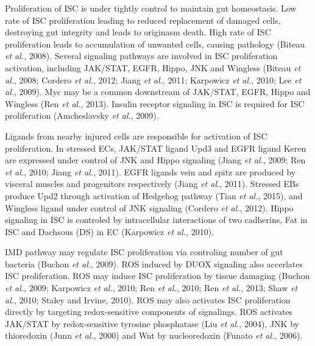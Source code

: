 \documentclass[11pt]{article}
\begin{document}
\newline

Proliferation of ISC is under tightly control to maintain gut homeostasis. 
Low rate of ISC proliferation leading to reduced replacement of damaged cells, destroying gut integrity and leads to originasm death. 
High rate of ISC proliferation leads to accumulation of unwanted cells, causing pathology (Biteau \textit{et al.}, 2008). 
Several signaling pathways are involved in ISC proliferation activation, including JAK/STAT, EGFR, Hippo, JNK and Wingless (Biteau \textit{et al.}, 2008; Cordero \textit{et al.}, 2012; Jiang \textit{et al.}, 2011; Karpowicz \textit{et al.}, 2010; Lee \textit{et al.}, 2009). 
Myc may be a common downstream of JAK/STAT, EGFR, Hippo and Wingless (Ren \textit{et al.}, 2013). 
Insulin receptor signaling in ISC is required for ISC proliferation (Amcheslavsky \textit{et al.}, 2009). 

\newline

Ligands from nearby injured cells are responsible for activation of ISC proliferation. 
In stressed ECs, JAK/STAT ligand Upd3 and EGFR ligand Keren are expressed under control of JNK and Hippo signaling (Jiang \textit{et al.}, 2009; Ren \textit{et al.}, 2010; Jiang \textit{et al.}, 2011). 
EGFR ligands vein and spitz are produced by visceral muscles and progenitors respectively (Jiang \textit{et al.}, 2011). 
Stressed EBs produce Upd2 through activation of Hedgehog pathway (Tian \textit{et al.}, 2015), and Wingless ligand under control of JNK signaling (Cordero \textit{et al.}, 2012). 
Hippo signaling in ISC is controled by intracellular interactions of two cadherins, Fat in ISC and Dachsous (DS) in EC (Karpowicz \textit{et al.}, 2010). 

\newline 

IMD pathway may regulate ISC proliferation via controling number of gut bacteria (Buchon \textit{et al.}, 2009). 
ROS induced by DUOX signaling also accerlates ISC proliferation. 
ROS may induce ISC proliferation by tissue damaging (Buchon \textit{et al.}, 2009; Karpowicz \textit{et al.}, 2010; Ren \textit{et al.}, 2010; Ren \textit{et al.}, 2013; Shaw \textit{et al.}, 2010; Staley and Irvine, 2010). 
ROS may also activates ISC proliferation directly by targeting redox-sensitive components of signalings. 
ROS activates JAK/STAT by redox-sensitive tyrosine phosphatase (Liu \textit{et al.}, 2004), JNK by thioredoxin (Junn \textit{et al.}, 2000) and Wnt by nucleoredoxin (Funato \textit{et al.}, 2006).
\end{document}
